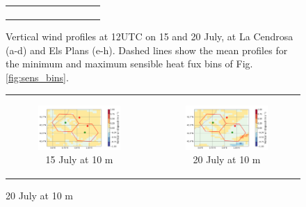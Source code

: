 \begin{figure}[hbtp]
{\begin{tabular}{@{}cccc@{}}
\begin{subfigure}[t]{0.283\textwidth}
        \end{subfigure} \\
    \end{tabular}
    }
    \caption{Vertical wind profiles at 12UTC on 15 and 20 July, at La Cendrosa (a-d) and Els Plans (e-h). Dashed lines show the mean profiles for the minimum and maximum sensible heat fux bins of Fig. \ref{fig:sens_bins}.}
    \label{fig:profiles_winds_sensbins}
\end{figure}

\begin{figure}[hbtp]
    \centering
    \begin{tabular}{cc}
        \begin{subfigure}[t]{0.5\textwidth}
            \caption{15 July at 10 m}
            \includegraphics[width=\textwidth]{images/chap6/IOP_maps/mesoNH_vertwind_10m_2021-07-15T12:00:00.png}
        \end{subfigure} &
        \begin{subfigure}[t]{0.5\textwidth}
            \caption{20 July at 10 m}
            \includegraphics[width=\textwidth]{images/chap6/IOP_maps/mesoNH_vertwind_10m_2021-07-20T12:00:00.png}

\end{subfigure}
\end{tabular}
\end{figure}
